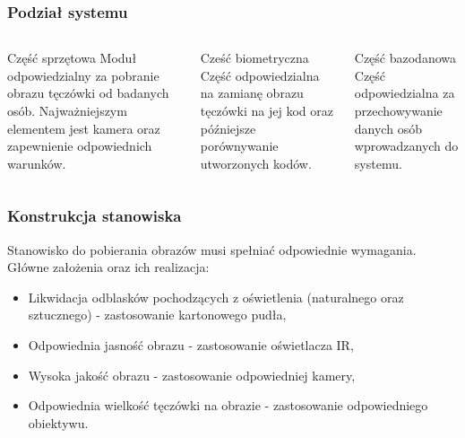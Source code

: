 \documentclass{beamer}
\begin{document}

\begin{frame}
\frametitle{Podział systemu}
\begin{columns}[t]
\begin{block}{Część sprzętowa}
Moduł odpowiedzialny za pobranie obrazu tęczówki od badanych osób. Najważniejszym elementem jest kamera oraz zapewnienie odpowiednich warunków.
\end{block}
\begin{block}{Cześć biometryczna}
Część odpowiedzialna na zamianę obrazu tęczówki na jej kod oraz późniejsze porównywanie utworzonych kodów.
\end{block}
\begin{block}{Część bazodanowa}
Część odpowiedzialna za przechowywanie danych osób wprowadzanych do systemu.
\end{block}
\end{columns} 

\end{frame}


\begin{frame}
\frametitle{Konstrukcja stanowiska}
Stanowisko do pobierania obrazów musi spełniać odpowiednie wymagania. Główne założenia oraz ich realizacja:
\begin{itemize}
\item Likwidacja odblasków pochodzących z oświetlenia (naturalnego oraz sztucznego) - zastosowanie kartonowego pudła,
\item Odpowiednia jasność obrazu - zastosowanie oświetlacza IR,
\item Wysoka jakość obrazu - zastosowanie odpowiedniej kamery,
\item Odpowiednia wielkość tęczówki na obrazie - zastosowanie odpowiedniego obiektywu.
\end{itemize}
\end{frame}
\end{document}
